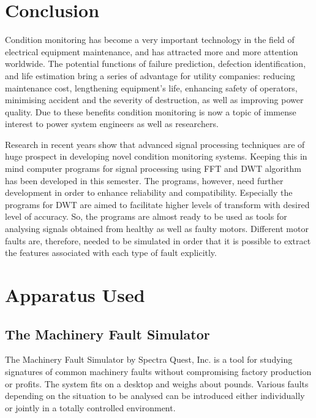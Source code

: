 \documentclass[a4paper,11pt]{report}
\begin{document}
\chapter{Conclusion}
Condition monitoring has become a very important technology in the field of electrical equipment maintenance, and has attracted more and more attention worldwide. The potential functions of failure prediction, defection identification, and life estimation bring a series of advantage for utility companies: reducing maintenance cost, lengthening equipment's life, enhancing safety of operators, minimising accident and the severity of destruction, as well as improving power quality. Due to these benefits condition monitoring is now a topic of immense interest to power system engineers as well as researchers.

Research in recent years show that advanced signal processing techniques are of huge prospect in developing novel condition monitoring systems. Keeping this in mind computer programs for signal processing using FFT and DWT algorithm has been developed in this semester. The programs, however, need further development in order to enhance reliability and compatibility. Especially the programs for DWT are aimed to facilitate higher levels of transform with desired level of accuracy. So, the programs are almost ready to be used as tools for analysing signals obtained from healthy as well as faulty motors. Different motor faults are, therefore, needed to be simulated in order that it is possible to extract the features associated with each type of fault explicitly.

	 
\clearpage
\appendix
\chapter{Apparatus Used}

\section{The Machinery Fault Simulator}
The Machinery Fault Simulator by Spectra Quest, Inc. is a tool for studying signatures of common machinery faults without compromising factory production or profits. The system fits on a desktop and weighs about \unit[130]{pounds}. Various faults depending on the situation to be analysed can be introduced either individually or jointly in a totally controlled environment.
\end{document}
